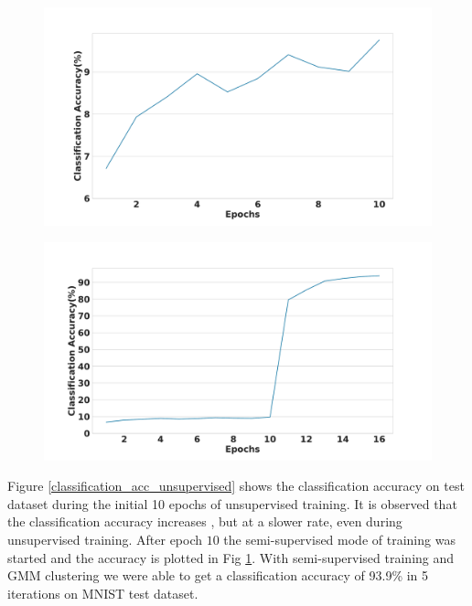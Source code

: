\documentclass[runningheads]{llncs}
\begin{document}
\begin{figure}[!t]
\centering
\begin{minipage}{.5\textwidth}
  \centering
  \includegraphics[width=.9\linewidth]{classification_acc_unsupervised}
  \label{classification_acc_unsupervised}
\end{minipage}%
\begin{minipage}{.5\textwidth}
  \centering
  \includegraphics[width=.9\linewidth]{classification_acc_semi_supervised}
  \label{classification_acc_semi_supervised}
\end{minipage}
\end{figure}

Figure \ref{classification_acc_unsupervised} shows the  classification accuracy on test dataset during the initial 10 epochs of unsupervised training.
It is observed that the classification accuracy increases , but at a slower rate,  even during unsupervised training.
After epoch $10$ the semi-supervised mode of training was started  and the accuracy is plotted in Fig \ref{classification_acc_semi_supervised}.
With semi-supervised training and GMM clustering we were able to get a classification accuracy of 93.9\% in 5 iterations on MNIST test dataset.
\end{document}

